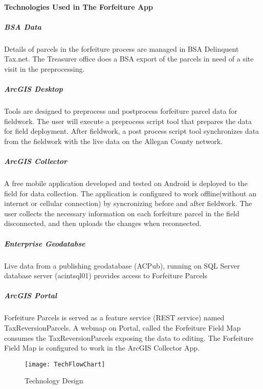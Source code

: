   \paragraph{Technologies Used in The Forfeiture App}
  \begin{adjmulticols}{2}{\innerMar}{\outerMar}
  \subparagraph{BSA Data}
  \noindent Details of parcels in the forfeiture process are managed in BSA Delinquent Tax.net.  The Treasurer office does a BSA export of the parcels in need of a site visit in the preprocessing.
  \subparagraph{ArcGIS Desktop}\noindent Tools are designed to preprocess and postprocess forfeiture parcel data for fieldwork.  The user will execute a preprocess script tool that prepares the data for field deployment.  After fieldwork, a post process script tool synchronizes data from the fieldwork with the live data on the Allegan County network.
  \subparagraph{ArcGIS Collector}\noindent A free mobile application developed and tested on Android is deployed to the field for data collection.  The application is configured to work offline(without an internet or cellular connection) by syncronizing before and after fieldwork. The user collects the necessary information on each forfeiture parcel in the field disconnected, and then uploads the changes when reconnected.
  \subparagraph{Enterprise Geodatabse}\noindent Live data from a publishing geodatabase (ACPub), running on SQL Server database server (acintsql01) provides access to Forfeiture Parcels
  \subparagraph{ArcGIS Portal} \noindent Forfeiture Parcels is served as a feature service (REST service)  named TaxReversionParcels.  A webmap on Portal, called the Forfeiture Field Map consumes the TaxReversionParcels exposing the data to editing.  The Forfeiture Field Map is configured to work in the ArcGIS Collector App.
  \end{adjmulticols}
  \begin{figure}[H]
  \centering
      \texttt{[image: TechFlowChart]}
  \vspace{-.25in}

  \caption{Technology Design}
  \end{figure}
  \clearpage
